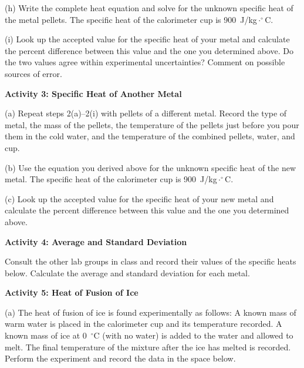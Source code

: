 (h) Write the complete heat equation and solve for the unknown specific
heat of the metal pellets.
The specific heat of the calorimeter cup is 900~J/kg$\cdot^{\circ}$C.
\answerspace{1.8in}

(i) Look up the accepted value for the specific heat of your metal and
calculate the percent difference between this value and the one you
determined above. Do the two values agree within experimental uncertainties?
Comment on possible sources of error.
\answerspace{20mm}

\pagebreak[2]
\textbf{Activity 3: Specific Heat of Another Metal}

(a) Repeat steps 2(a)--2(i) with pellets of a different metal.
Record the type of metal, the mass of the pellets, the temperature of the
pellets just before you pour them in the cold water, and the temperature of the
combined pellets, water, and cup.
\answerspace{15mm}

(b) Use the equation you derived above for the unknown specific
heat of the new metal. 
The specific heat of the calorimeter cup is 900~J/kg$\cdot^{\circ}$C.

\answerspace{2.5cm}

(c) Look up the accepted value for the specific heat of your new metal and
calculate the percent difference between this value and the one you
determined above. 
\answerspace{25mm}

\textbf{Activity 4: Average and Standard Deviation}

Consult the other lab groups in class and record their values of the specific
heats below.
Calculate the average and standard deviation for each metal.
\answerspace{1.2in}


\textbf{Activity 5: Heat of Fusion of Ice}

(a) The heat of fusion of ice is found experimentally as follows:
A known mass of warm water is placed in the calorimeter cup and its
temperature recorded. A known mass of ice at 0~$^{\circ}$C (with
no water) is added to the water and allowed to melt. The final temperature
of the mixture after the ice has melted is recorded. Perform the experiment
and record the data in the space below.

